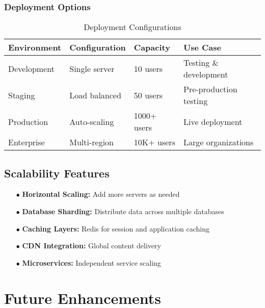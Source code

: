 \documentclass[12pt,a4paper]{report}
\begin{document}
\subsection{Deployment Options}

\begin{table}[H]
    \centering
    \caption{Deployment Configurations}
    \label{tab:deployment}
    \begin{tabular}{|l|l|l|l|}
        \hline
        \rowcolor{primaryblue!20}
        \textbf{Environment} & \textbf{Configuration} & \textbf{Capacity} & \textbf{Use Case} \\
        \hline
        Development & Single server & 10 users & Testing \& development \\
        \hline
        Staging & Load balanced & 50 users & Pre-production testing \\
        \hline
        Production & Auto-scaling & 1000+ users & Live deployment \\
        \hline
        Enterprise & Multi-region & 10K+ users & Large organizations \\
        \hline
    \end{tabular}
\end{table}

\section{Scalability Features}

\begin{itemize}[leftmargin=2cm]
    \item[\textcolor{secondarygreen}{$\bullet$}] \textbf{Horizontal Scaling:} Add more servers as needed
    \item[\textcolor{secondarygreen}{$\bullet$}] \textbf{Database Sharding:} Distribute data across multiple databases
    \item[\textcolor{secondarygreen}{$\bullet$}] \textbf{Caching Layers:} Redis for session and application caching
    \item[\textcolor{secondarygreen}{$\bullet$}] \textbf{CDN Integration:} Global content delivery
    \item[\textcolor{secondarygreen}{$\bullet$}] \textbf{Microservices:} Independent service scaling
\end{itemize}

\chapter{Future Enhancements}
\end{document}
